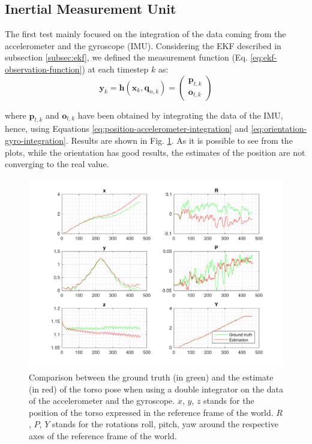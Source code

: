 \documentclass[a4paper]{article}
\begin{document}
\subsection{Inertial Measurement Unit}
The first test mainly focused on the integration of the data coming from
the accelerometer and the gyroscope (IMU). Considering the EKF described in
subsection \ref{subsec:ekf}, we defined the measurement function (Eq.
\ref{eq:ekf-observation-function}) at each timestep $k$ as:
\begin{equation}
    \bm{y}_k = \bm{h}(\bm{x}_k, \bm{q}_{n, k}) =
        \begin{pmatrix}
            \bm{p}_{t, k} \\
            \bm{o}_{t, k}
        \end{pmatrix}
\end{equation}

\noindent where $\bm{p}_{t, k}$ and $\bm{o}_{t, k}$ have been obtained by
integrating the data of the IMU, hence, using Equations \ref{eq:position-accelerometer-integration}
and \ref{eq:orientation-gyro-integration}. Results are shown in Fig.
\ref{fig:comp_ground_truth_estimated_torso_accelerometer}. As it is possible
to see from the plots, while the orientation has good results, the estimates of
the position are not converging to the real value.
\begin{figure}
    \centering
    \includegraphics[width=\textwidth]{images/accelerometer}
    \caption{Comparison between the ground truth (in green) and the estimate (in red) of the torso
        pose when using a double integrator on the data of the accelerometer
        and the gyroscope. $x$, $y$, $z$ stands for the position
        of the torso expressed in the reference frame of the
        world. $R$, $P$, $Y$ stands for the rotations roll,
        pitch, yaw around the respective axes of the
        reference frame of the world.}
    \label{fig:comp_ground_truth_estimated_torso_accelerometer}
\end{figure}
\end{document}
